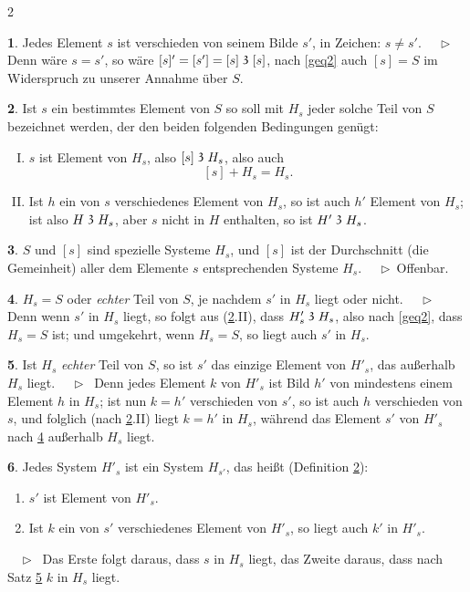 \documentclass[leqno,hidelinks,10pt]{article}
\theoremstyle{definition}
\newtheorem{satz}{\protect\satzname}
\newtheorem{deff}[satz]{\protect\deffname}
\newcommand{\satzname}{}
\newcommand{\deffname}{}
\renewcommand{\satzname}{\hspace{-4pt}.\ Satz}%
\renewcommand{\deffname}{\hspace{-4pt}.\ Definition}%
\renewcommand{\satzname}{\hspace{-4pt}.\ Theorem}%
\renewcommand{\deffname}{\hspace{-4pt}.\ Definition}%
\newcommand\Beweis{\medskip \newline $ \phantom{'.'} \rhd \ $}%
\newcommand\beweis{ $ \phantom{'.'} \rhd \ $}%
\newcommand\TeilVon{\mathrel{\raisebox{0.45ex}{$\mathfrak{3}$}}}
\newcommand{\sref}[1]{\underline{\ref{#1}}}%
\begin{document}
\begin{paracol}{2}
\begin{leftcolumn}
\begin{satz}\label{gthm2}
Jedes Element $s$ ist verschieden von seinem Bilde $s'$, in Zeichen: $s \neq s'$.
\Beweis
Denn wäre $s = s'$, so wäre $[s]' = [s'] = [s] \TeilVon [s]$, nach \eqref{geq2}
auch $[s] = S$ im Widerspruch zu unserer Annahme über $S$.
\end{satz}

\newpage

\begin{deff}\label{gdef3}
Ist $s$ ein bestimmtes Element von $S$ so soll mit $H_s$ jeder solche Teil von
$S$ bezeichnet werden, der den beiden folgenden Bedingungen genügt:
\begin{enumerate}[I.]
\item $s$ ist Element von $H_s$, also $[s] \TeilVon H_s$, also auch
\[
    [s] + H_s = H_s.
\]
\item Ist $h$ ein von $s$ verschiedenes Element von $H_s$, so ist auch $h'$
Element von $H_s$; ist also $H \TeilVon H_s$, aber $s$ nicht in $H$ enthalten,
so ist $H' \TeilVon H_s$.
\end{enumerate}
\end{deff}

\begin{satz}\label{gthm4}
$S$ und $[s]$ sind spezielle Systeme $H_s$, und $[s]$ ist der Durchschnitt
(die Gemeinheit) aller dem Elemente $s$ entsprechenden Systeme $H_s$.
\Beweis Offenbar.
\end{satz}

\begin{satz}\label{gthm5}
$H_s = S$ oder \textit{echter} Teil von $S$, je nachdem $s'$ in $H_s$ liegt oder nicht.
\Beweis
Denn wenn $s'$ in $H_s$ liegt, so folgt aus (\sref{gdef3}.II),
dass $H'_s \TeilVon H_s$, also nach \eqref{geq2}, dass $H_s = S$ ist; und umgekehrt,
wenn $H_s = S$, so liegt auch $s'$ in $H_s$.
\end{satz}

\begin{satz}\label{gthm6}
Ist $H_s$ \emph{echter} Teil von $S$, so ist $s'$ das einzige Element von $H'_s$,
das außerhalb $H_s$ liegt.
\Beweis
Denn jedes Element $k$ von $H'_s$ ist Bild $h'$ von mindestens einem Element $h$
in $H_s$; ist nun $k=h'$ verschieden von $s'$, so ist auch $h$ verschieden von $s$,
und folglich (nach \sref{gdef3}.II) liegt $k = h'$ in $H_s$,
während das Element $s'$ von $H'_s$ nach \sref{gthm5} außerhalb $H_s$ liegt.
\end{satz}

\begin{satz}\label{gthm7}
Jedes System $H'_s$ ist ein System $H_{s'}$, das heißt (Definition \sref{gdef3}):
\begin{enumerate}[I$'$.]
    \item $s'$ ist Element von $H'_s$.
    \item Ist $k$ ein von $s'$ verschiedenes Element von $H'_s$, so liegt auch $k'$ in $H'_s$.
\end{enumerate}
\beweis
Das Erste folgt daraus, dass $s$ in $H_s$ liegt, das Zweite daraus,
dass nach Satz \sref{gthm6} $k$ in $H_s$ liegt.
\end{satz}


\end{leftcolumn}
\end{paracol}
\end{document}
